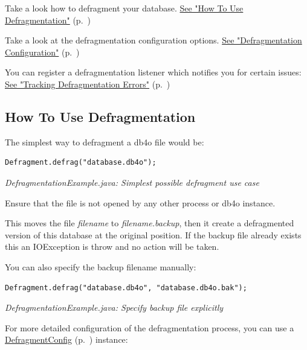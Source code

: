 Take a look how to defragment your database. \hyperref[ref:advanced-topics-defragment-how-to-use-defragmentation]{See "How To Use Defragmentation"} (p.~\pageref{ref:advanced-topics-defragment-how-to-use-defragmentation})

Take a look at the defragmentation configuration options. \hyperref[ref:advanced-topics-defragment-defragmentation-configuration]{See "Defragmentation Configuration"} (p.~\pageref{ref:advanced-topics-defragment-defragmentation-configuration})

You can register a defragmentation listener which notifies you for certain issues: \hyperref[ref:advanced-topics-defragment-tracking-defragmentation-errors]{See "Tracking Defragmentation Errors"} (p.~\pageref{ref:advanced-topics-defragment-tracking-defragmentation-errors})

\subsection{How To Use Defragmentation}
\label{ref:advanced-topics-defragment-how-to-use-defragmentation}

The simplest way to defragment a db4o file would be:

\begin{lstlisting}
Defragment.defrag("database.db4o");
\end{lstlisting}

{\small\itshape DefragmentationExample.java: Simplest possible defragment use case\par}
\medskip

Ensure that the file is not opened by any other process or db4o instance.

This moves the file \emph{filename }to \emph{filename.backup}, then it create a defragmented version of this database at the original position. If the backup file already exists this an IOException is throw and no action will be taken.

You can also specify the backup filename manually:

\begin{lstlisting}
Defragment.defrag("database.db4o", "database.db4o.bak");
\end{lstlisting}

{\small\itshape DefragmentationExample.java: Specify backup file explicitly\par}
\medskip

For more detailed configuration of the defragmentation process, you can use a \hyperref[ref:advanced-topics-defragment-defragmentation-configuration]{DefragmentConfig} (p.~\pageref{ref:advanced-topics-defragment-defragmentation-configuration}) instance:

